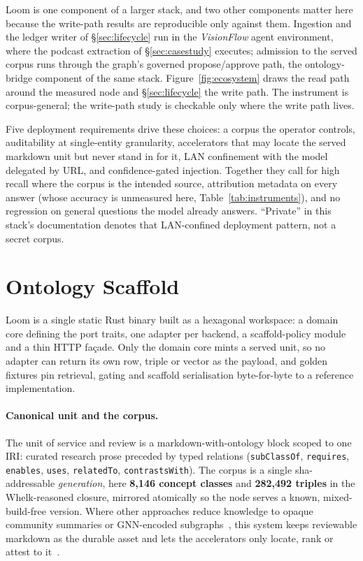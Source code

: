 \documentclass[10pt,twocolumn]{article}
\begin{document}
Loom is one component of a larger stack, and two other components matter here because the write-path results are reproducible only against them. Ingestion and the ledger writer of \S\ref{sec:lifecycle} run in the \emph{VisionFlow} agent environment, where the podcast extraction of \S\ref{sec:casestudy} executes; admission to the served corpus runs through the graph's governed propose/approve path, the ontology-bridge component of the same stack. Figure~\ref{fig:ecosystem} draws the read path around the measured node and \S\ref{sec:lifecycle} the write path. The instrument is corpus-general; the write-path study is checkable only where the write path lives.

Five deployment requirements drive these choices: a corpus the operator controls, auditability at single-entity granularity, accelerators that may locate the served markdown unit but never stand in for it, LAN confinement with the model delegated by URL, and confidence-gated injection. Together they call for high recall where the corpus is the intended source, attribution metadata on every answer (whose accuracy is unmeasured here, Table~\ref{tab:instruments}), and no regression on general questions the model already answers. ``Private'' in this stack's documentation denotes that LAN-confined deployment pattern, not a secret corpus.




\section{Ontology Scaffold}\label{sec:system}
Loom is a single static Rust binary built as a hexagonal workspace: a domain core defining the port traits, one adapter per backend, a scaffold-policy module and a thin HTTP façade. Only the domain core mints a served unit, so no adapter can return its own row, triple or vector as the payload, and golden fixtures pin retrieval, gating and scaffold serialisation byte-for-byte to a reference implementation.

\paragraph{Canonical unit and the corpus.} The unit of service and review is a markdown-with-ontology block scoped to one IRI: curated research prose preceded by typed relations (\texttt{subClassOf}, \texttt{requires}, \texttt{enables}, \texttt{uses}, \texttt{relatedTo}, \texttt{contrastsWith}). The corpus is a single sha-addressable \emph{generation}, here \textbf{8{,}146 concept classes} and \textbf{282{,}492 triples} in the Whelk-reasoned closure, mirrored atomically so the node serves a known, mixed-build-free version. Where other approaches reduce knowledge to opaque community summaries or GNN-encoded subgraphs~\cite{edge2024graphrag,he2024gretriever}, this system keeps reviewable markdown as the durable asset and lets the accelerators only locate, rank or attest to it~\cite{garcez2023neurosymbolic}.
\end{document}
